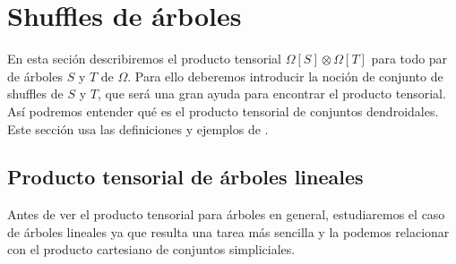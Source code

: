\documentclass[../main.tex]{subfiles}
\begin{document}
\section{Shuffles de \'arboles}
En esta seci\'on describiremos el producto tensorial $\Omega[S]\otimes\Omega[T]$ para todo par de \'arboles $S$ y $T$ de $\Omega$. Para ello deberemos introducir la noci\'on de conjunto de shuffles de $S$ y $T$, que ser\'a una gran ayuda para encontrar el producto tensorial. As\'i podremos entender qu\'e es el producto tensorial de conjuntos dendroidales. Este secci\'on usa las definiciones y ejemplos de \cite[Cap\'itulo 4.3]{DS}.
\subsection{Producto tensorial de \'arboles lineales}
Antes de ver el producto tensorial para \'arboles en general, estudiaremos el caso de \'arboles lineales ya que resulta una tarea m\'as sencilla y la podemos relacionar con el producto cartesiano de conjuntos simpliciales.
\end{document}
